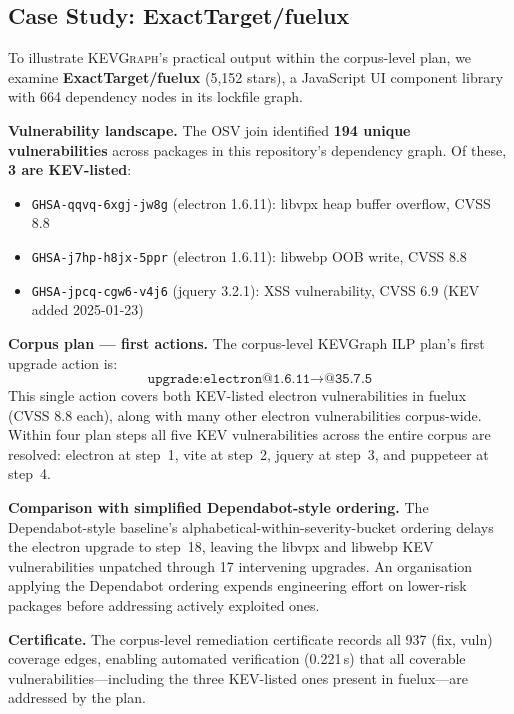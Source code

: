 \documentclass[conference]{IEEEtran}
\newcommand{\kevgraph}{\textsc{KEVGraph}\xspace}
\begin{document}
\subsection{Case Study: ExactTarget/fuelux}
\label{sec:case}

To illustrate \kevgraph's practical output within the corpus-level
plan, we examine \textbf{ExactTarget/fuelux} (5,152 stars), a
JavaScript UI component library with 664 dependency nodes in its
lockfile graph.

\textbf{Vulnerability landscape.}
The OSV join identified \textbf{194 unique vulnerabilities} across
packages in this repository's dependency graph.  Of these, \textbf{3
are KEV-listed}:

\begin{itemize}
  \item \texttt{GHSA-qqvq-6xgj-jw8g} (electron 1.6.11):
        libvpx heap buffer overflow, CVSS 8.8
  \item \texttt{GHSA-j7hp-h8jx-5ppr} (electron 1.6.11):
        libwebp OOB write, CVSS 8.8
  \item \texttt{GHSA-jpcq-cgw6-v4j6} (jquery 3.2.1):
        XSS vulnerability, CVSS 6.9 (KEV added 2025-01-23)
\end{itemize}

\textbf{Corpus plan --- first actions.}
The corpus-level KEVGraph ILP plan's first upgrade action is:
\[
  \texttt{upgrade:electron@1.6.11} \to \texttt{@35.7.5}
\]
This single action covers both KEV-listed electron vulnerabilities in
fuelux (CVSS 8.8 each), along with many other electron vulnerabilities
corpus-wide.  Within four plan steps all five KEV vulnerabilities
across the entire corpus are resolved: electron at step~1, vite at
step~2, jquery at step~3, and puppeteer at step~4.

\textbf{Comparison with simplified Dependabot-style ordering.}
The Dependabot-style baseline's alphabetical-within-severity-bucket
ordering delays the electron upgrade to step~18, leaving the libvpx
and libwebp KEV vulnerabilities unpatched through 17 intervening
upgrades.  An organisation applying the Dependabot ordering expends
engineering effort on lower-risk packages before addressing actively
exploited ones.

\textbf{Certificate.}
The corpus-level remediation certificate records all 937 (fix, vuln)
coverage edges, enabling automated verification (0.221\,s) that all
coverable vulnerabilities---including the three KEV-listed ones present
in fuelux---are addressed by the plan.
\end{document}
